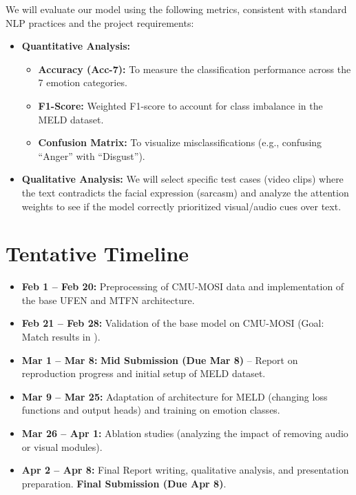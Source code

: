 \documentclass[11pt]{article}
\begin{document}
We will evaluate our model using the following metrics, consistent with standard NLP practices and the project requirements:

\begin{itemize}
    \item \textbf{Quantitative Analysis:}
    \begin{itemize}
        \item \textbf{Accuracy (Acc-7):} To measure the classification performance across the 7 emotion categories.
        \item \textbf{F1-Score:} Weighted F1-score to account for class imbalance in the MELD dataset.
        \item \textbf{Confusion Matrix:} To visualize misclassifications (e.g., confusing ``Anger'' with ``Disgust'').
    \end{itemize}
    
    \item \textbf{Qualitative Analysis:} We will select specific test cases (video clips) where the text contradicts the facial expression (sarcasm) and analyze the attention weights to see if the model correctly prioritized visual/audio cues over text.
\end{itemize}

\section{Tentative Timeline}

\begin{itemize}
    \item \textbf{Feb 1 -- Feb 20:} Preprocessing of CMU-MOSI data and implementation of the base UFEN and MTFN architecture.
    \item \textbf{Feb 21 -- Feb 28:} Validation of the base model on CMU-MOSI (Goal: Match results in \citet{cai2025multimodal}).
    \item \textbf{Mar 1 -- Mar 8:} \textbf{Mid Submission (Due Mar 8)} -- Report on reproduction progress and initial setup of MELD dataset.
    \item \textbf{Mar 9 -- Mar 25:} Adaptation of architecture for MELD (changing loss functions and output heads) and training on emotion classes.
    \item \textbf{Mar 26 -- Apr 1:} Ablation studies (analyzing the impact of removing audio or visual modules).
    \item \textbf{Apr 2 -- Apr 8:} Final Report writing, qualitative analysis, and presentation preparation. \textbf{Final Submission (Due Apr 8)}.
\end{itemize}



\end{document}
